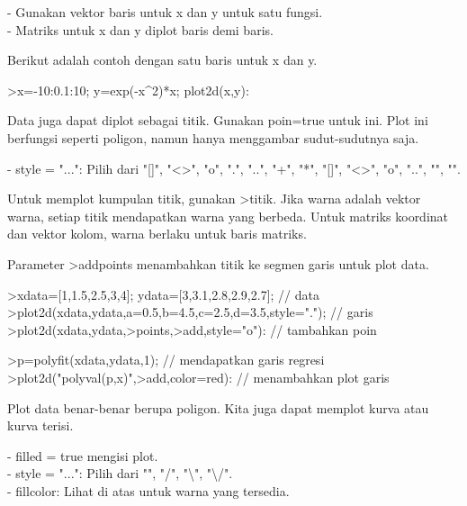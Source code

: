 \documentclass[12pt,Times new roman,letterpaper]{book}
\begin{document}
\begin{eulernootebook}
\begin{eulercomment}
\begin{eulercomment}
\begin{eulernootebook}
\begin{eulercomment}
\begin{eulercomment}
\begin{eulercomment}
\begin{eulercomment}
\begin{eulercomment}
\begin{eulercomment}
\begin{eulercomment}
\begin{eulernotebook}
\begin{eulercomment}
\begin{eulercomment}
\begin{eulercomment}
\begin{eulercomment}
\begin{eulercomment}
- Gunakan vektor baris untuk x dan y untuk satu fungsi.\\
- Matriks untuk x dan y diplot baris demi baris. 

Berikut adalah contoh dengan satu baris untuk x dan y.


\end{eulercomment}
\begin{eulerprompt}
>x=-10:0.1:10; y=exp(-x^2)*x; plot2d(x,y):
\end{eulerprompt}
\begin{eulercomment}
Data juga dapat diplot sebagai titik. Gunakan poin=true untuk ini.
Plot ini berfungsi seperti poligon, namun hanya menggambar
sudut-sudutnya saja.

- style = "...": Pilih dari "[]", "\textless{}\textgreater{}", "o", ".", "..", "+", "*",
"[]", "\textless{}\textgreater{}", "o", "..", "", "\textbar{}".

Untuk memplot kumpulan titik, gunakan \textgreater{}titik. Jika warna adalah vektor
warna, setiap titik mendapatkan warna yang berbeda. Untuk matriks
koordinat dan vektor kolom, warna berlaku untuk baris matriks.

Parameter \textgreater{}addpoints menambahkan titik ke segmen garis untuk plot
data.
\end{eulercomment}
\begin{eulerprompt}
>xdata=[1,1.5,2.5,3,4]; ydata=[3,3.1,2.8,2.9,2.7]; // data
>plot2d(xdata,ydata,a=0.5,b=4.5,c=2.5,d=3.5,style="."); // garis
>plot2d(xdata,ydata,>points,>add,style="o"): // tambahkan poin
\end{eulerprompt}
\begin{eulerprompt}
>p=polyfit(xdata,ydata,1); // mendapatkan garis regresi
>plot2d("polyval(p,x)",>add,color=red): // menambahkan plot garis
\end{eulerprompt}
\begin{eulercomment}
Plot data benar-benar berupa poligon. Kita juga dapat memplot kurva
atau kurva terisi.

- filled = true mengisi plot.\\
- style = "...": Pilih dari "", "/", "\textbackslash{}", "\textbackslash{}/".\\
- fillcolor: Lihat di atas untuk warna yang tersedia.


\end{eulercomment}
\end{eulercomment}
\end{eulercomment}
\end{eulercomment}
\end{eulercomment}
\end{eulernotebook}
\end{eulercomment}
\end{eulercomment}
\end{eulercomment}
\end{eulercomment}
\end{eulercomment}
\end{eulercomment}
\end{eulercomment}
\end{eulernootebook}
\end{eulercomment}
\end{eulercomment}
\end{eulernootebook}
\end{document}
